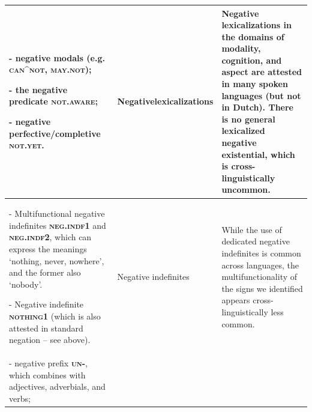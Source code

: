 \documentclass[output=paper,colorlinks,citecolor=brown]{langscibook}
\begin{document}
\begin{table}
\begin{tabularx}{\textwidth}{p{9cm}>{\raggedright}p{1.5cm}X}
                - negative modals (e.g. \textbf{\textsc{can}}\^{}\textbf{\textsc{not}}, \textbf{\textsc{may.not}});
                
                - the negative predicate \textbf{\textsc{not.aware}};
                
                - negative perfective/completive \textbf{\textsc{not.yet}}. 
        & Negative\newline lexicalizations
        & Negative lexicalizations in the domains of modality, cognition, and aspect are attested in many spoken languages (but not in Dutch). There is no general lexicalized negative existential, which is cross-linguistically uncommon. \\
            
\midrule
                - Multifunctional negative indefinites \textbf{\textsc{neg.indf1}} and \textbf{\textsc{neg.indf2}}, which can express the meanings `nothing, never, nowhere', and the former also `nobody'. 
                
                - Negative indefinite \textbf{\textsc{nothing1}} (which is also attested in standard negation -- see above). 
            & Negative indefinites 
            & While the use of dedicated negative indefinites is common across languages, the multifunctionality of the signs we identified appears cross-linguistically less common. \\ 
\midrule
                 
                 - negative prefix \textbf{\textsc{un-}}, which combines with adjectives, adverbials, and verbs; 
                 

\end{tabularx}
\end{table}
\end{document}
